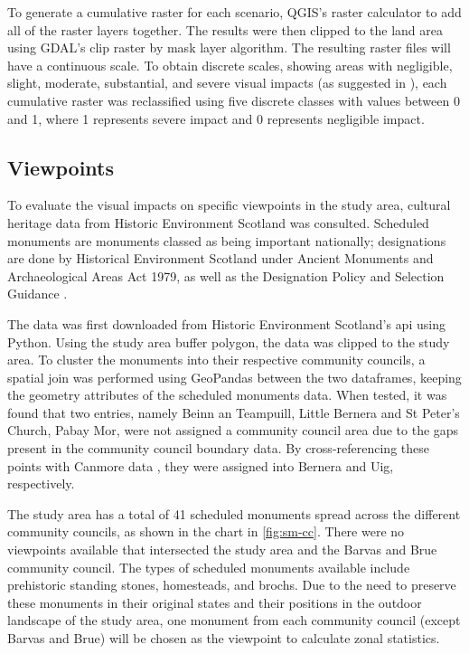 To generate a cumulative raster for each scenario, QGIS's raster calculator to
add all of the raster layers together. The results were then clipped to the
land area using GDAL's clip raster by mask layer algorithm. The resulting
raster files will have a continuous scale. To obtain discrete scales, showing
areas with negligible, slight, moderate, substantial, and severe visual impacts
(as suggested in \cite{falconer2013}), each cumulative raster was reclassified
using five discrete classes with values between 0 and 1, where 1 represents
severe impact and 0 represents negligible impact.

\subsection{Viewpoints}

To evaluate the visual impacts on specific viewpoints in the study area,
cultural heritage data from Historic Environment Scotland was consulted.
Scheduled monuments are monuments classed as being important nationally;
designations are done by Historical Environment Scotland under Ancient
Monuments and Archaeological Areas Act 1979, as well as the Designation Policy
and Selection Guidance \autocite{hes-scheduling}.

The data was first downloaded from Historic Environment Scotland's \gls{api}
using Python. Using the study area buffer polygon, the data was clipped to the
study area. To cluster the monuments into their respective community councils,
a spatial join was performed using GeoPandas between the two dataframes,
keeping the geometry attributes of the scheduled monuments data. When tested,
it was found that two entries, namely Beinn an Teampuill, Little Bernera and St
Peter's Church, Pabay Mor, were not assigned a community council area due to
the gaps present in the community council boundary data. By cross-referencing
these points with Canmore data \autocite{canmore}, they were assigned into
Bernera and Uig, respectively.

The study area has a total of 41 scheduled monuments spread across the
different community councils, as shown in the chart in \autoref{fig:sm-cc}.
There were no viewpoints available that intersected the study area and the
Barvas and Brue community council. The types of scheduled monuments available
include prehistoric standing stones, homesteads, and brochs. Due to the need to
preserve these monuments in their original states and their positions in the
outdoor landscape of the study area, one monument from each community council
(except Barvas and Brue) will be chosen as the viewpoint to calculate zonal
statistics.

